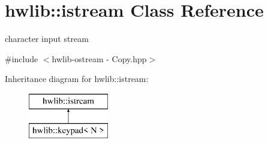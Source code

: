 \hypertarget{classhwlib_1_1istream}{}\section{hwlib\+:\+:istream Class Reference}
\label{classhwlib_1_1istream}


character input stream  




{\ttfamily \#include $<$hwlib-\/ostream -\/ Copy.\+hpp$>$}

Inheritance diagram for hwlib\+:\+:istream\+:\begin{figure}[H]
\begin{center}
\leavevmode
\includegraphics[height=2.000000cm]{classhwlib_1_1istream}
\end{center}
\end{figure}

